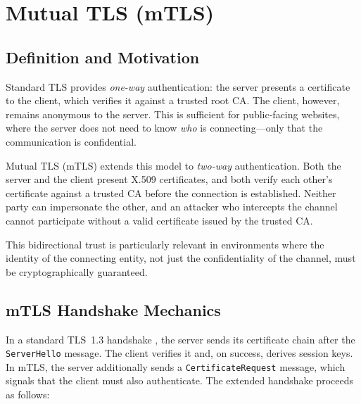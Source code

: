 \documentclass[10pt,twocolumn]{article}
\begin{document}
\section{Mutual TLS (mTLS)}

\subsection{Definition and Motivation}

Standard TLS provides \emph{one-way} authentication: the server presents a
certificate to the client, which verifies it against a trusted root CA. The
client, however, remains anonymous to the server. This is sufficient for
public-facing websites, where the server does not need to know \emph{who}
is connecting---only that the communication is confidential.


Mutual TLS (mTLS) extends this model to \emph{two-way} authentication.
Both the server and the client present X.509 certificates, and both verify
each other's certificate against a trusted CA before the connection is
established. Neither party can impersonate the other, and an attacker who
intercepts the channel cannot participate without a valid certificate issued
by the trusted CA.

This bidirectional trust is particularly relevant in environments where the
identity of the connecting entity, not just the confidentiality of the
channel, must be cryptographically guaranteed.

\subsection{mTLS Handshake Mechanics}

In a standard TLS~1.3 handshake \cite{rfc8446}, the server sends its
certificate chain after the \texttt{ServerHello} message. The client
verifies it and, on success, derives session keys. In mTLS, the server
additionally sends a \texttt{CertificateRequest} message, which signals
that the client must also authenticate. The extended handshake proceeds
as follows:
\end{document}
